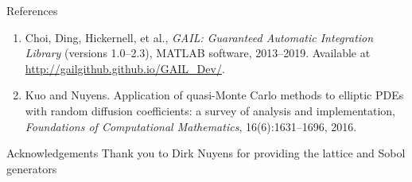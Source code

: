 \documentclass[final]{beamer}
\newlength{\onecolwid}
\begin{document}
\begin{frame}[t]
\begin{columns}[t]
\begin{column}{\onecolwid}
\begin{block}{References}
\begin{enumerate}
    \item Choi,  Ding,  Hickernell,  et al., \textit{GAIL: Guaranteed Automatic Integration Library} (versions 1.0--2.3),
    MATLAB software, 2013--2019. Available at \url{http://gailgithub.github.io/GAIL_Dev/}.
    
    \item Kuo and Nuyens. Application of quasi-Monte Carlo methods to elliptic PDEs with random diffusion coefficients: a survey of analysis and implementation, \textit{Foundations of Computational Mathematics}, 16(6):1631--1696, 2016.

\end{enumerate}
\end{block}
\begin{block}{Acknowledgements}
    Thank you to Dirk Nuyens for providing the lattice and Sobol generators 
\end{block}
\end{column}
\end{columns}
\end{frame}
\end{document}

